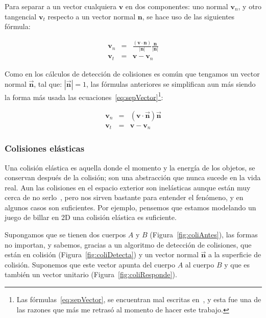 Para separar a un vector cualquiera $\textbf{v}$ en dos componentes: uno normal $\textbf{v}_n$, y otro tangencial $\textbf{v}_t$ respecto a un vector normal $\textbf{n}$, se hace uso de las siguientes fórmula:

\begin{eqnarray}
\textbf{v}_n & = &\frac{(\textbf{v} \cdot \textbf{n})}{|\textbf{n}|} \frac{\textbf{n}}{|\textbf{n}|} \nonumber \\
\textbf{v}_t & = & \textbf{v} - \textbf{v}_n \nonumber
\end{eqnarray}

Como en los cálculos de detección de colisiones es común que tengamos un vector normal $\vec{\textbf{n}}$, tal que: $|\vec{\textbf{n}}| = 1$, las fórmulas anteriores se simplifican aun más siendo la forma más usada las ecuaciones~\eqref{eq:sepVector}\footnote{Las fórmulas~\eqref{eq:sepVector}, se encuentran mal escritas en~\cite{BaraffWitkin:Coursenotes}, y esta fue una de las razones que más me retrasó al momento de hacer este trabajo.}:

\begin{eqnarray}
\textbf{v}_n & = &(\textbf{v} \cdot \vec{\textbf{n}}) \vec{\textbf{n}} \nonumber \\
\textbf{v}_t & = & \textbf{v} - \textbf{v}_n
\label{eq:sepVector} 
\end{eqnarray}

\subsubsection{Colisiones elásticas}

Una colisión elástica es aquella donde el momento y la energía de los objetos, se conservan después de la colisión; son una abstracción que nunca sucede en la vida real.
Aun las colisiones en el espacio exterior son inelásticas aunque están muy cerca de no serlo~\cite{FisicaMatematicasVideojuegos}, pero nos sirven bastante para entender el fenómeno, y en algunos casos son suficientes.
Por ejemplo, pensemos que estamos modelando un juego de billar en 2D una colisión elástica es suficiente.

Supongamos que se tienen dos cuerpos $A$ y $B$ (Figura~\ref{fig:coliAntes}), las formas no importan, y sabemos, gracias a un algoritmo de detección de colisiones, que están en colisión (Figura~\ref{fig:coliDetecta}) y un vector normal $\vec{\textbf{n}}$ a la superficie de colisión.
Suponemos que este vector apunta del cuerpo $A$ al cuerpo $B$ y que es también un vector unitario (Figura~\ref{fig:coliResponde}).


